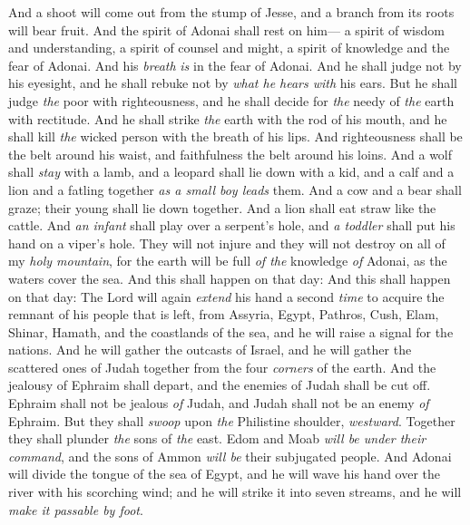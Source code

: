\begin{biblechapter} %
 And a shoot will come out from the stump of Jesse, 
and a branch from its roots will bear fruit.
\verse And the spirit of Adonai shall rest on him— 
a spirit of wisdom and understanding, 
a spirit of counsel and might, 
a spirit of knowledge and the fear of Adonai.
\verse And his \textit{breath} \textit{is} in the fear of Adonai. 
And he shall judge not by his eyesight, 
and he shall rebuke not by \textit{what he hears with} his ears.
\verse But he shall judge \textit{the} poor with righteousness, 
and he shall decide for \textit{the} needy of \textit{the} earth with rectitude. 
And he shall strike \textit{the} earth with the rod of his mouth, 
and he shall kill \textit{the} wicked person with the breath of his lips.
\verse And righteousness shall be the belt around his waist, 
and faithfulness the belt around his loins.
\verse And a wolf shall \textit{stay} with a lamb, 
and a leopard shall lie down with a kid, 
and a calf and a lion and a fatling together 
\textit{as a small boy leads} them.
\verse And a cow and a bear shall graze; 
their young shall lie down together. 
And a lion shall eat straw like the cattle.
\verse And \textit{an infant} shall play over a serpent’s hole, 
and \textit{a toddler} shall put his hand on a viper’s hole.
\verse They will not injure and they will not destroy on all of my \textit{holy mountain}, 
for the earth will be full \textit{of the} knowledge \textit{of} Adonai, 
as the waters cover the sea.
\verse And this shall happen on that day:
 And this shall happen on that day:
\verse The Lord will again \textit{extend} his hand a second \textit{time} 
to acquire the remnant of his people that is left, 
from Assyria, Egypt, Pathros, Cush, Elam, Shinar, Hamath, and the coastlands of the sea,
\verse and he will raise a signal for the nations. 
And he will gather the outcasts of Israel, 
and he will gather the scattered ones of Judah together from the four \textit{corners} of the earth.
\verse And the jealousy of Ephraim shall depart, 
and the enemies of Judah shall be cut off. 
Ephraim shall not be jealous \textit{of} Judah, 
and Judah shall not be an enemy \textit{of} Ephraim.
\verse But they shall \textit{swoop} upon \textit{the} Philistine shoulder, \textit{westward}. 
Together they shall plunder \textit{the} sons of \textit{the} east. 
Edom and Moab \textit{will be under their command}, 
and the sons of Ammon \textit{will be} their subjugated people.
\verse And Adonai will divide the tongue of the sea of Egypt, 
and he will wave his hand over the river with his scorching wind; 
and he will strike it into seven streams, 
and he will \textit{make it passable by foot}.
\end{biblechapter}

